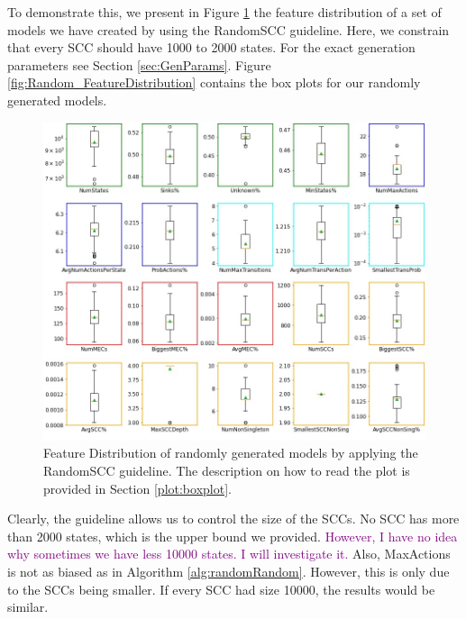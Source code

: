 To demonstrate this, we present in Figure \ref{fig:RandomSCC_FeatureDistributions} the feature distribution of a set of models we have created by using the RandomSCC guideline.
Here, we constrain that every SCC should have 1000 to 2000 states. For the exact generation parameters see Section \ref{sec:GenParams}.
Figure \ref{fig:Random_FeatureDistribution} contains the box plots for our randomly generated models.
\begin{figure}[h!]
    \centering
    \includegraphics[width=1\textwidth]{figures/RandomSCC_FeatureDistribution.jpg}
    \caption[Feature Distribution of randomly generated models with the RandomSCC guideline]{
        Feature Distribution of randomly generated models by applying the RandomSCC guideline. The description on how to read the plot is provided in Section \ref{plot:boxplot}.
    }
    \label{fig:RandomSCC_FeatureDistributions}
\end{figure}
\FloatBarrier

\label{insights:sccDistribution}
Clearly, the guideline allows us to control the size of the SCCs. No SCC has more than 2000 states, which is the upper bound we provided.
\textcolor{purple}{However, I have no idea why sometimes we have less 10000 states. I will investigate it.}
Also, MaxActions is not as biased as in Algorithm \ref{alg:randomRandom}. However, this is only due to the SCCs being smaller.
If every SCC had size 10000, the results would be similar.

